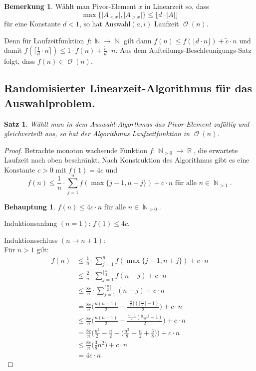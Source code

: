 \documentclass[a4paper,12pt]{article}
\DeclareMathOperator{\N}{\mathbb N}
\DeclareMathOperator{\R}{\mathbb R}
\DeclareMathOperator{\BigO}{\mathcal O}
\newtheorem{satz}[axiom]{Satz}
\theoremstyle{definition}
\newtheorem*{bemerkung}{Bemerkung}
\newtheorem*{behauptung}{Behauptung}
\begin{document}
	\setcounter{section}{8}
	\setcounter{subsection}{14}
	\begin{bemerkung}
		Wählt man Pivor-Element $x$ in Linearzeit so, dass 
		\[
			\max\{\lvert A_{<x}\rvert, \lvert A_{>x}\rvert\} \leq \lfloor d \cdot \lvert A\rvert\rfloor
		\]
		für eine Konstante $d < 1$, so hat Auswahl$(a, i)$ Laufzeit $\BigO(n)$.
	\end{bemerkung}
	
	Denn für Laufzeitfunktion $f: \N \to \N$ gilt dann $f(n) \leq f(\lfloor d \cdot n\rfloor) + \tilde{c} \cdot n$ und damit $f(\lceil \frac{1}{d} \cdot n\rceil) \leq 1 \cdot f(n) + \frac{\tilde{c}}{d} \cdot n$. Aus dem Aufteilungs-Beschleunigungs-Satz folgt, dass $f(n) \in \BigO(n)$.
	
	\subsection{Randomisierter Linearzeit-Algorithmus für das Auswahlproblem.}
	\begin{satz}
		Wählt man in dem Auswahl-Algorthmus das Pivor-Element zufällig und gleichverteilt aus, so hat der Algorithmus Laufzeitfunktion in $\BigO(n)$.
	\end{satz}
	\begin{proof}
		Betrachte monoton wachsende Funktion $f: \N_{>0} \to \R$, die erwartete Laufzeit nach oben beschränkt. Nach Konstruktion des Algorithmus gibt es eine Konstante $c > 0$ mit $f(1) = 4c$ und
		\[
			f(n) \leq \frac{1}{n} \cdot \sum_{j = 1}^{n}f(\max\{j - 1, n - j\}) + c \cdot n \text{ für alle } n \in \N_{>1}.
 		\]
 		\begin{behauptung}
 			$f(n) \leq 4c \cdot n$ für alle $n \in \N_{>0}$.
 		\end{behauptung}
 		Induktionsanfang $(n = 1)$: $f(1) \leq 4c$.
 		
 		Induktionsschluss $(n \to n + 1)$:\\
 		Für $n > 1$ gilt:
 		\begin{align*}
 			f(n) &\leq \frac{1}{n} \cdot \sum_{j = 1}^{n}f(\max\{j - 1, n + j\}) + c \cdot n\\
 			&\leq \frac{2}{n} \cdot \sum_{j = 1}^{\lceil \frac{n}{2} \rceil}f(n - j) + c\cdot n\\
 			&\leq \frac{8c}{n} \cdot \sum_{j = 1}^{\lceil \frac{n}{2} \rceil}(n - j) + c\cdot n\\
 			&= \frac{8c}{n}\Big(\frac{n(n - 1)}{2} - \frac{\lfloor \frac{n}{2} \rfloor (\lfloor \frac{n}{2} \rfloor - 1)}{2}\Big) + c \cdot n\\
 			&\leq \frac{8c}{n}\Big(\frac{n(n - 1)}{2} - \frac{\frac{n - 1}{2}(\frac{n - 1}{2} - 1)}{2}\Big) + c\cdot n\\
 			&= \frac{8c}{n}\Big(\frac{n^2}{2} - \frac{n}{2} - \big(\frac{n^2}{8} - \frac{n}{2} + \frac{3}{8}\big)\Big) + c \cdot n\\
 			&\leq \frac{8c}{n}\Big(\frac{3}{8}n^2\Big) + c\cdot n\\
 			&= 4c \cdot n
 		\end{align*}
	\end{proof}
\end{document}
